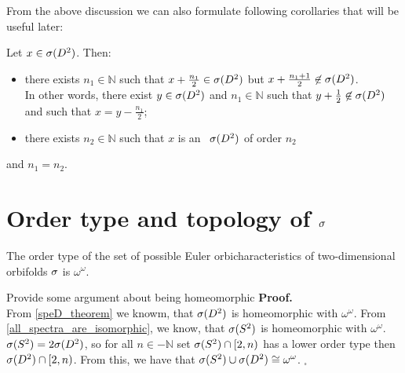 From the above discussion we can also formulate following corollaries that will be useful later:

\begin{corollary}\label{predescors}
Let $x \in {{\sigma}(D^2)}$. Then:
\begin{itemize}
\item there exists $n_1 \in \mathbb{N}$ such that $x + \frac{n_1}{2} \in {{\sigma}(D^2)}$ 
but $x+\frac{n_1+1}{2} \not\in {{\sigma}(D^2)}$. \\ In other words, there exist $y \in {{\sigma}(D^2)}$ and 
$n_1 \in \mathbb{N}$ such that 
$y + \frac{1}{2} \not\in {{\sigma}(D^2)}$ and such that $x = y - \frac{n_1}{2}$;
\item there exists $n_2 \in \mathbb{N}$ such that $x$ is an \apots\ ${{\sigma}(D^2)}$ of 
order $n_2$
\end{itemize}
and $n_1 = n_2$.
\end{corollary}




\section{Order type and topology of ${\sigma}$}
\begin{theorem}
The order type of the set of possible Euler orbicharacteristics of two-dimensional orbifolds 
${\sigma}$ is $\omega^\omega$. 
\end{theorem}
Provide some argument about being homeomorphic 
\noindent\textbf{Proof.} \\
From \ref{speD_theorem} we knowm, that ${{\sigma}(D^2)}$ is homeomorphic with $\omega^\omega$. From 
\ref{all_spectra_are_isomorphic}, we know, that ${{\sigma}(S^2)}$ is homeomorphic 
with $\omega^\omega$. \\
${{\sigma}(S^2)} = 2{{\sigma}(D^2)}$, so for all $n\in -\mathbb{N}$ set ${{\sigma}(S^2)} \cap [2,n)$ has a lower order type then 
${{\sigma}(D^2)}\cap [2,n)$. From this, we have that ${{\sigma}(S^2)} \cup {{\sigma}(D^2)} \cong \omega^\omega$. $_\square$ \\[4pt]

